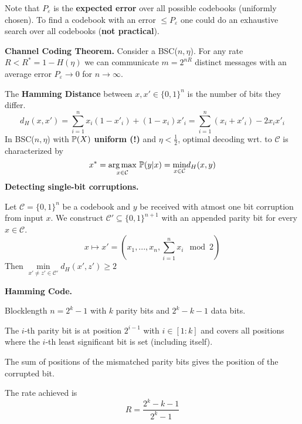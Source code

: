  Note that \(P_\varepsilon\) is the \textbf{expected error} over all possible codebooks (uniformly chosen). 
 To find a codebook with an error \(\leq P_\varepsilon\) one could do an exhaustive search over 
 all codebooks (\textbf{not practical}).

\vspace*{1mm}
 \textbf{Channel Coding Theorem.} Consider a BSC(\(n, \eta\)). For any rate \(R < R^* = 1- H(\eta)\) we can 
 communicate \(m = 2^{nR}\) distinct messages with an average error \(P_\varepsilon \to 0\) for \(n \to \infty\). 

 The \textbf{Hamming Distance} between \(x, x' \in \{0,1\}^n\) is the number of bits they differ.
 \[d_H(x, x') = \sum_{i = 1}^n x_i(1-x'_i)+(1-x_i)x'_i = \sum_{i = 1}^n (x_i + x'_i)-2x_ix'_i\]
In BSC(\(n, \eta\)) with \(\P(X)\) \textbf{uniform (!)} and \(\eta < \frac{1}{2}\), optimal 
decoding wrt. to \(\mathcal{C}\) is characterized by \[x^* = \underset{x \in \mathcal{C}}{\arg \max} \ \P(y|x) = \underset{x \in \mathcal{C}}{\min} d_H(x, y)\] 
\textbf{Detecting single-bit corruptions.}

Let \(\mathcal{C} = \{0, 1\}^n\) be a codebook and \(y\) be received with atmost one bit corruption from input \(x\).
We construct \(\mathcal{C}' \subseteq \{0,1\}^{n+1}\) with an appended parity bit for every \(x \in \mathcal{C}\).
\[x \mapsto x' = \left(x_1, ..., x_n, \sum_{i = 1}^n x_i \mod 2\right)\]
Then \(\underset{x'\neq z' \in \mathcal{C}'}{\min} d_H(x', z') \geq 2\)

\textbf{Hamming Code.}

Blocklength \(n = 2^k-1\) with \(k\) parity bits and \(2^k-k-1\) data bits. 

The \(i\)-th parity bit is at position \(2^{i-1}\) with \(i \in [1:k]\) and 
covers all positions where the \(i\)-th least significant bit is set (including itself).

The sum of positions of the mismatched parity bits gives the position of the corrupted bit.

The rate achieved is \[R = \frac{2^k-k-1}{2^k-1}\]
